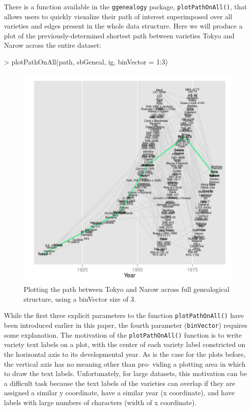 \documentclass{article}
\numberwithin{equation}{section} %
\newcommand{\pkg}[1]{{\texttt{#1}}}
\begin{document}
There is a function available in the \pkg{ggenealogy} package, \texttt{plotPathOnAll()}, that allows users to quickly visualize their path of interest superimposed over all varieties and edges present in the whole data structure. Here we will produce a plot of the previously-determined shortest path between varieties Tokyo and Narow across the entire dataset:

\begin{Schunk}
\begin{Sinput}
> plotPathOnAll(path, sbGeneal, ig, binVector = 1:3)
\end{Sinput}
\end{Schunk}

\begin{figure} 
  \begin{center} 
\includegraphics{ggenealogy-plotPathOnAll1}
\end{center} 
\caption{Plotting the path between Tokyo and Narow across full genealogical structure, using a binVector size of 3.}
\label{fig:plotPathOnAll1}
\end{figure}

While the first three explicit parameters to the function \texttt{plotPathOnAll()} have been introduced earlier in this paper, the fourth parameter (\texttt{binVector}) requires some explanation. The motivation of the \texttt{plotPathOnAll()} function is to write variety text labels on a plot, with the center of each variety label constricted on the horizontal axis to its developmental year. As is the case for the plots before, the vertical axis has no meaning other than pro- viding a plotting area in which to draw the text labels. Unfortunately, for large datasets, this motivation can be a difficult task because the text labels of the varieties can overlap if they are assigned a similar y coordinate, have a similar year (x coordinate), and have labels with large numbers of characters (width of x coordinate).
\end{document}
